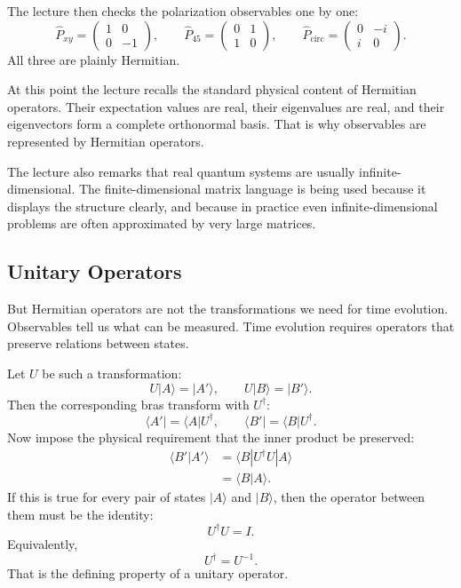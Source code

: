 The lecture then checks the polarization observables one by one:
\begin{equation}
\hat P_{xy}=
\begin{pmatrix}
1&0\\
0&-1
\end{pmatrix},
\qquad
\hat P_{45}=
\begin{pmatrix}
0&1\\
1&0
\end{pmatrix},
\qquad
\hat P_{\mathrm{circ}}=
\begin{pmatrix}
0&-i\\
i&0
\end{pmatrix}.
\end{equation}
All three are plainly Hermitian.

At this point the lecture recalls the standard physical content of Hermitian operators. Their expectation values are real, their eigenvalues are real, and their eigenvectors form a complete orthonormal basis. That is why observables are represented by Hermitian operators.

The lecture also remarks that real quantum systems are usually infinite-dimensional. The finite-dimensional matrix language is being used because it displays the structure clearly, and because in practice even infinite-dimensional problems are often approximated by very large matrices.

\subsection{Unitary Operators}

But Hermitian operators are not the transformations we need for time evolution. Observables tell us what can be measured. Time evolution requires operators that preserve relations between states.

Let $U$ be such a transformation:
\begin{equation}
U|A\rangle=|A'\rangle,
\qquad
U|B\rangle=|B'\rangle.
\end{equation}
Then the corresponding bras transform with $U^\dagger$:
\begin{equation}
\langle A'|=\langle A|U^\dagger,
\qquad
\langle B'|=\langle B|U^\dagger.
\end{equation}
Now impose the physical requirement that the inner product be preserved:
\begin{align}
\langle B'|A'\rangle
&=
\langle B|U^\dagger U|A\rangle \\
&=
\langle B|A\rangle.
\end{align}
If this is true for every pair of states $|A\rangle$ and $|B\rangle$, then the operator between them must be the identity:
\begin{equation}
U^\dagger U=I.
\end{equation}
Equivalently,
\begin{equation}
U^\dagger=U^{-1}.
\end{equation}
That is the defining property of a unitary operator.

